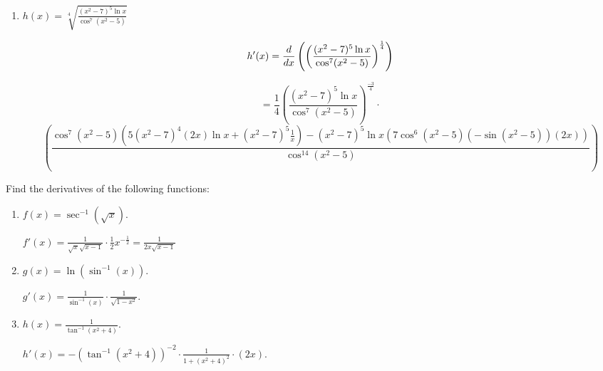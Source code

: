 \documentclass[handout,nooutcomes]{ximera}
\begin{document}
\begin{problem}
\begin{enumerate}
		
		
	\item  $h(x) = \sqrt[4]{\frac{(x^2 - 7)^5 \ln x}{\cos^7(x^2 - 5)}}$
		\begin{freeResponse}
		$$h'(x) = \frac{d}{dx} \left( \left( \frac{(x^2 - 7)^5 \ln x}{\cos^7(x^2 - 5)} \right)^{\frac{1}{4}} \right) $$
		
		$$=  \frac{1}{4} \left( \frac{(x^2 - 7)^5 \ln x}{\cos^7(x^2 - 5)} \right)^{\frac{-3}{4}} \cdot $$
		$$\left( \frac{\cos^7(x^2 - 5)(5(x^2-7)^4(2x) \ln x + (x^2-7)^5 \frac{1}{x}) - (x^2-7)^5 \ln x (7\cos^6(x^2-5) (-\sin(x^2 - 5))(2x))}{\cos^{14}(x^2 - 5)} \right)$$
		\end{freeResponse}
		
		
		
	\end{enumerate}
		
		
\end{problem}
















\begin{problem}
Find the derivatives of the following functions:
	\begin{enumerate}
	
	\item  $f(x) = \sec^{-1} (\sqrt{x})$.
		\begin{freeResponse}
		$f'(x) = \frac{1}{\sqrt{x} \sqrt{x - 1}} \cdot \frac{1}{2} x^{-\frac{1}{2}} = \frac{1}{2x\sqrt{x-1}}$
		\end{freeResponse}
		
		
		
	\item  $g(x) = \ln (\sin^{-1}(x))$.
		\begin{freeResponse}
		$g'(x) = \frac{1}{\sin^{-1}(x)} \cdot \frac{1}{\sqrt{1-x^2}}$.
		\end{freeResponse}
		
		
		
	\item  $h(x) = \frac{1}{\tan^{-1}(x^2 + 4)}$.  
		\begin{freeResponse}
		$h'(x) = - \left( \tan^{-1}(x^2 + 4) \right)^{-2} \cdot \frac{1}{1 + (x^2 + 4)^2} \cdot (2x)$.
		\end{freeResponse}
		
		
		
	\end{enumerate}
		
		
\end{problem}
\end{document}
